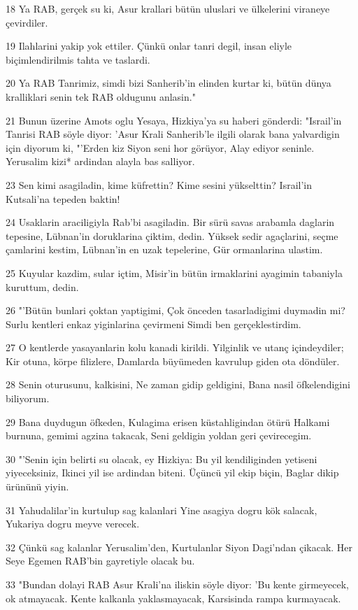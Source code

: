 \par 18 Ya RAB, gerçek su ki, Asur krallari bütün uluslari ve ülkelerini viraneye çevirdiler.
\par 19 Ilahlarini yakip yok ettiler. Çünkü onlar tanri degil, insan eliyle biçimlendirilmis tahta ve taslardi.
\par 20 Ya RAB Tanrimiz, simdi bizi Sanherib'in elinden kurtar ki, bütün dünya kralliklari senin tek RAB oldugunu anlasin."
\par 21 Bunun üzerine Amots oglu Yesaya, Hizkiya'ya su haberi gönderdi: "Israil'in Tanrisi RAB söyle diyor: 'Asur Krali Sanherib'le ilgili olarak bana yalvardigin için diyorum ki, "'Erden kiz Siyon seni hor görüyor, Alay ediyor seninle. Yerusalim kizi* ardindan alayla bas salliyor.
\par 23 Sen kimi asagiladin, kime küfrettin? Kime sesini yükselttin? Israil'in Kutsali'na tepeden baktin!
\par 24 Usaklarin araciligiyla Rab'bi asagiladin. Bir sürü savas arabamla daglarin tepesine, Lübnan'in doruklarina çiktim, dedin. Yüksek sedir agaçlarini, seçme çamlarini kestim, Lübnan'in en uzak tepelerine, Gür ormanlarina ulastim.
\par 25 Kuyular kazdim, sular içtim, Misir'in bütün irmaklarini ayagimin tabaniyla kuruttum, dedin.
\par 26 "'Bütün bunlari çoktan yaptigimi, Çok önceden tasarladigimi duymadin mi? Surlu kentleri enkaz yiginlarina çevirmeni Simdi ben gerçeklestirdim.
\par 27 O kentlerde yasayanlarin kolu kanadi kirildi. Yilginlik ve utanç içindeydiler; Kir otuna, körpe filizlere, Damlarda büyümeden kavrulup giden ota döndüler.
\par 28 Senin oturusunu, kalkisini, Ne zaman gidip geldigini, Bana nasil öfkelendigini biliyorum.
\par 29 Bana duydugun öfkeden, Kulagima erisen küstahligindan ötürü Halkami burnuna, gemimi agzina takacak, Seni geldigin yoldan geri çevirecegim.
\par 30 "'Senin için belirti su olacak, ey Hizkiya: Bu yil kendiliginden yetiseni yiyeceksiniz, Ikinci yil ise ardindan biteni. Üçüncü yil ekip biçin, Baglar dikip ürününü yiyin.
\par 31 Yahudalilar'in kurtulup sag kalanlari Yine asagiya dogru kök salacak, Yukariya dogru meyve verecek.
\par 32 Çünkü sag kalanlar Yerusalim'den, Kurtulanlar Siyon Dagi'ndan çikacak. Her Seye Egemen RAB'bin gayretiyle olacak bu.
\par 33 "Bundan dolayi RAB Asur Krali'na iliskin söyle diyor: 'Bu kente girmeyecek, ok atmayacak. Kente kalkanla yaklasmayacak, Karsisinda rampa kurmayacak.
